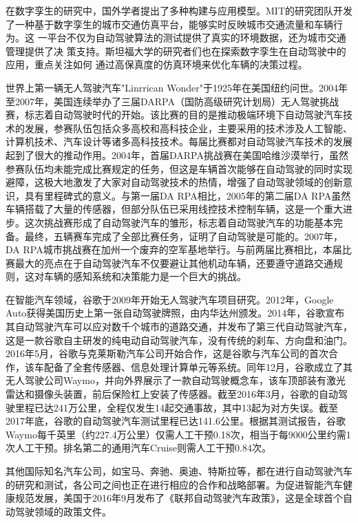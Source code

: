 在数字孪生的研究中，国外学者提出了多种构建与应用模型。MIT的研究团队开发
了一种基于数字孪生的城市交通仿真平台，能够实时反映城市交通流量和车辆行为。这
一平台不仅为自动驾驶算法的测试提供了真实的环境数据，还为城市交通管理提供了决
策支持。斯坦福大学的研究者们也在探索数字孪生在自动驾驶中的应用，重点关注如何
通过高保真度的仿真环境来优化车辆的决策过程。

世界上第一辆无人驾驶汽车"Linrrican Wonder"于1925年在美国纽约问世。2004年至2007年，美国连续举办了三届DARPA（国防高级研究计划局）无人驾驶挑战赛，标志着自动驾驶时代的开始。该比赛的目的是推动极端环境下自动驾驶汽车技术的发展，参赛队伍包括众多高校和高科技企业，主要采用的技术涉及人工智能、计算机技术、汽车设计等诸多高科技技术。每届比赛都对自动驾驶汽车技术的发展起到了很大的推动作用。2004年，首届DARPA挑战赛在美国哈维沙漠举行，虽然参赛队伍均未能完成比赛规定的任务，但这是车辆首次能够在自动驾驶的同时实现避障，这极大地激发了大家对自动驾驶技术的热情，增强了自动驾驶领域的创新意识，具有里程碑式的意义。与第一届DA RPA相比，2005年的第二届DA RPA虽然车辆搭载了大量的传感器，但部分队伍已采用线控技术控制车辆，这是一个重大进步。这次挑战赛形成了自动驾驶汽车的雏形，标志着自动驾驶汽车的功能基本完备。最终，五辆赛车完成了全部比赛任务，证明了自动驾驶是可能的。2007年，DA RPA城市挑战赛在加州一个废弃的空军基地举行。与前两届比赛相比，本届比赛最大的亮点在于自动驾驶汽车不仅要避让其他机动车辆，还要遵守道路交通规则，这对车辆的感知系统和决策能力是一个巨大的挑战。

在智能汽车领域，谷歌于2009年开始无人驾驶汽车项目研究。2012年，Google Auto获得美国历史上第一张自动驾驶牌照，由内华达州颁发。2014年，谷歌宣布其自动驾驶汽车可以应对数千个城市的道路交通，并发布了第三代自动驾驶汽车，这是一款谷歌自主研发的纯电动自动驾驶汽车，没有传统的刹车、方向盘和油门。2016年5月，谷歌与克莱斯勒汽车公司开始合作，这是谷歌与汽车公司的首次合作，该车配备了全套传感器、信息处理计算单元等系统。同年12月，谷歌成立了其无人驾驶公司Waymo，并向外界展示了一款自动驾驶概念车，该车顶部装有激光雷达和摄像头装置，前后保险杠上安装了传感器。截至2016年3月，谷歌的自动驾驶里程已达241万公里，全程仅发生14起交通事故，其中13起为对方失误\cite{janai2020computer}。截至2017年底，谷歌的自动驾驶汽车测试里程已达141.6公里。根据其测试报告，谷歌Waymo每千英里（约227.4万公里）仅需人工干预0.18次，相当于每9000公里约需1次人工干预。排名第二的通用汽车Cruise则需人工干预0.84次。

其他国际知名汽车公司，如宝马、奔驰、奥迪、特斯拉等，都在进行自动驾驶汽车的研究和测试，各公司之间也正在进行相应的合作和战略部署。为促进智能汽车健康规范发展，美国于2016年9月发布了《联邦自动驾驶汽车政策》，这是全球首个自动驾驶领域的政策文件\cite{陈燕申2017美国政府}。

